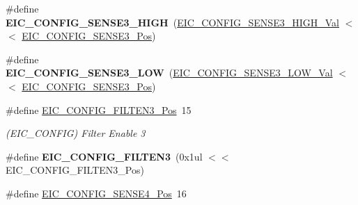 \begin{DoxyCompactItemize}
\item 
\hypertarget{group___s_a_m_l21___e_i_c_ga578849e63e490e04dda9f78ec3674da1}{}\#define {\bfseries E\+I\+C\+\_\+\+C\+O\+N\+F\+I\+G\+\_\+\+S\+E\+N\+S\+E3\+\_\+\+H\+I\+G\+H}~(\hyperlink{group___s_a_m_l21___e_i_c_gac73c1ef1256ac37c4a05f3f3437ca87d}{E\+I\+C\+\_\+\+C\+O\+N\+F\+I\+G\+\_\+\+S\+E\+N\+S\+E3\+\_\+\+H\+I\+G\+H\+\_\+\+Val}    $<$$<$ \hyperlink{group___s_a_m_l21___e_i_c_ga831aeaf54a89c732e999bddee6ad0cbf}{E\+I\+C\+\_\+\+C\+O\+N\+F\+I\+G\+\_\+\+S\+E\+N\+S\+E3\+\_\+\+Pos})\label{group___s_a_m_l21___e_i_c_ga578849e63e490e04dda9f78ec3674da1}

\item 
\hypertarget{group___s_a_m_l21___e_i_c_ga69a5938a46054fe30a1661c0194814ba}{}\#define {\bfseries E\+I\+C\+\_\+\+C\+O\+N\+F\+I\+G\+\_\+\+S\+E\+N\+S\+E3\+\_\+\+L\+O\+W}~(\hyperlink{group___s_a_m_l21___e_i_c_gacd770ca16cc8b9bd76408b1ab7391ff5}{E\+I\+C\+\_\+\+C\+O\+N\+F\+I\+G\+\_\+\+S\+E\+N\+S\+E3\+\_\+\+L\+O\+W\+\_\+\+Val}     $<$$<$ \hyperlink{group___s_a_m_l21___e_i_c_ga831aeaf54a89c732e999bddee6ad0cbf}{E\+I\+C\+\_\+\+C\+O\+N\+F\+I\+G\+\_\+\+S\+E\+N\+S\+E3\+\_\+\+Pos})\label{group___s_a_m_l21___e_i_c_ga69a5938a46054fe30a1661c0194814ba}

\item 
\hypertarget{group___s_a_m_l21___e_i_c_gaf8ffa2628676573b96658108f610e95e}{}\#define \hyperlink{group___s_a_m_l21___e_i_c_gaf8ffa2628676573b96658108f610e95e}{E\+I\+C\+\_\+\+C\+O\+N\+F\+I\+G\+\_\+\+F\+I\+L\+T\+E\+N3\+\_\+\+Pos}~15\label{group___s_a_m_l21___e_i_c_gaf8ffa2628676573b96658108f610e95e}

\begin{DoxyCompactList}\small\item\em (E\+I\+C\+\_\+\+C\+O\+N\+F\+I\+G) Filter Enable 3 \end{DoxyCompactList}\item 
\hypertarget{group___s_a_m_l21___e_i_c_ga34cd2035be4ce980a8480e58c79d6dd1}{}\#define {\bfseries E\+I\+C\+\_\+\+C\+O\+N\+F\+I\+G\+\_\+\+F\+I\+L\+T\+E\+N3}~(0x1ul $<$$<$ E\+I\+C\+\_\+\+C\+O\+N\+F\+I\+G\+\_\+\+F\+I\+L\+T\+E\+N3\+\_\+\+Pos)\label{group___s_a_m_l21___e_i_c_ga34cd2035be4ce980a8480e58c79d6dd1}

\item 
\hypertarget{group___s_a_m_l21___e_i_c_gad23c76b1fbf7d30fa3aa738a38c453c3}{}\#define \hyperlink{group___s_a_m_l21___e_i_c_gad23c76b1fbf7d30fa3aa738a38c453c3}{E\+I\+C\+\_\+\+C\+O\+N\+F\+I\+G\+\_\+\+S\+E\+N\+S\+E4\+\_\+\+Pos}~16\label{group___s_a_m_l21___e_i_c_gad23c76b1fbf7d30fa3aa738a38c453c3}


\end{DoxyCompactItemize}
